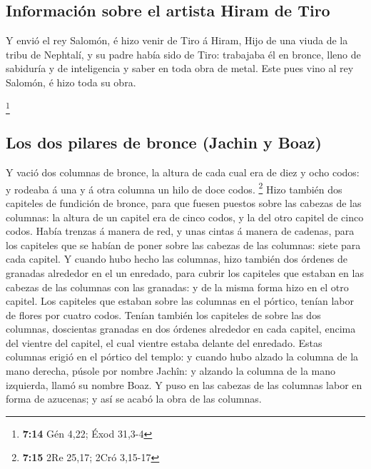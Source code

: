 \hypertarget{informaciuxf3n-sobre-el-artista-hiram-de-tiro}{%
\subsection{Información sobre el artista Hiram de
Tiro}\label{informaciuxf3n-sobre-el-artista-hiram-de-tiro}}

 Y envió el rey Salomón, é hizo venir de Tiro á Hiram,
 Hijo de una viuda de la tribu de Nephtalí, y su padre
había sido de Tiro: trabajaba él en bronce, lleno de sabiduría y de
inteligencia y saber en toda obra de metal. Este pues vino al rey
Salomón, é hizo toda su obra.

\footnote{\textbf{7:14} Gén 4,22; Éxod 31,3-4}

\hypertarget{los-dos-pilares-de-bronce-jachin-y-boaz}{%
\subsection{Los dos pilares de bronce (Jachin y
Boaz)}\label{los-dos-pilares-de-bronce-jachin-y-boaz}}

 Y vació dos columnas de bronce, la altura de cada cual
era de diez y ocho codos: y rodeaba á una y á otra columna un hilo de
doce codos. \footnote{\textbf{7:15} 2Re 25,17; 2Cró 3,15-17}
 Hizo también dos capiteles de fundición de bronce, para
que fuesen puestos sobre las cabezas de las columnas: la altura de un
capitel era de cinco codos, y la del otro capitel de cinco codos.
 Había trenzas á manera de red, y unas cintas á manera de
cadenas, para los capiteles que se habían de poner sobre las cabezas de
las columnas: siete para cada capitel.  Y cuando hubo
hecho las columnas, hizo también dos órdenes de granadas alrededor en el
un enredado, para cubrir los capiteles que estaban en las cabezas de las
columnas con las granadas: y de la misma forma hizo en el otro capitel.
 Los capiteles que estaban sobre las columnas en el
pórtico, tenían labor de flores por cuatro codos.  Tenían
también los capiteles de sobre las dos columnas, doscientas granadas en
dos órdenes alrededor en cada capitel, encima del vientre del capitel,
el cual vientre estaba delante del enredado.  Estas
columnas erigió en el pórtico del templo: y cuando hubo alzado la
columna de la mano derecha, púsole por nombre Jachîn: y alzando la
columna de la mano izquierda, llamó su nombre Boaz.  Y
puso en las cabezas de las columnas labor en forma de azucenas; y así se
acabó la obra de las columnas.

